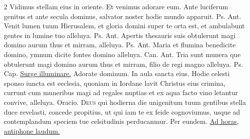 \begin{multicols*}{2}
 \V Vidimus stellam eius in oriente. \R Et venimus adorare eum.
 Ante luciferum genitus et ante secula dominus, salvator noster hodie mundo apparuit. {\color{Red} Ps.}  {\color{Red} Ant.} Venit lumen tuum Hierusalem, et gloria domini super te orta est, et ambulabunt gentes in lumine tuo alleluya. {\color{Red} Ps.}  {\color{Red} Ant.} Apertis thesauris suis obtulerunt magi domino aurum thus et mirram, alleluya. {\color{Red} Ps.}  {\color{Red} Ant.} Maria et flumina benedicite domino, ymnum dicite fontes domino alleluya. {\color{Red} Can.}  {\color{Red} Ant.} Tria sunt munera que obtulerunt magi domino aurum thus et mirram, filio de regi magno alleluya. {\color{Red} Ps.}  {\color{Red} Cap.} \hyperlink{surge-capitulum}{Surge illuminare.}
\newline \V Adorate dominum. \R In aula sancta eius.
 Hodie celesti sponso iuncta est ecclesia, quoniam in Iordane lavit Christus eius crimina, currunt cum muneribus magi ad regales nuptias et ex aqua facto vino letantur convive, alleluya. {\color{Red} Oracio.}
\lettrine[lines=2]{\zallmancaps \color{Blue} D}{eus} \hypertarget{deus-qui-hodierna-epiphanie}{qui} hodierna die unigenitum tuum gentibus stella duce revelasti, concede propitius, ut qui iam te ex feide cognoviumus, usque ad contemplandum speciem tue celsitudinis perducanmur. Per eundem. \ul{Ad horas, antiphone laudum.}

\end{multicols*}
